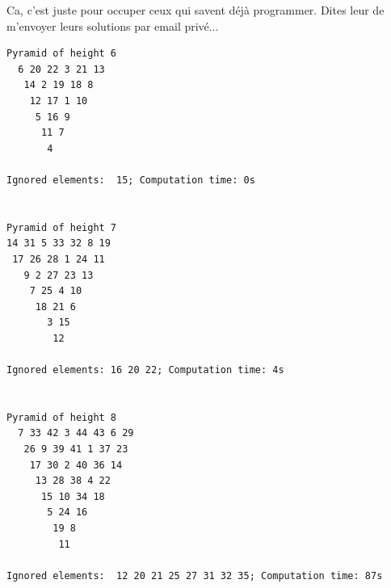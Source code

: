 \documentclass[10pt]{article}\usepackage[correction,nu]{esial}
\begin{document}
\begin{Reponse}
  Ca, c'est juste pour occuper ceux qui savent déjà programmer. Dites leur de
  m'envoyer leurs solutions par email privé...

  \begin{Verbatim}
Pyramid of height 6
  6 20 22 3 21 13
   14 2 19 18 8
    12 17 1 10
     5 16 9
      11 7
       4
  
Ignored elements:  15; Computation time: 0s
  

Pyramid of height 7
14 31 5 33 32 8 19
 17 26 28 1 24 11
   9 2 27 23 13
    7 25 4 10
     18 21 6
       3 15
        12

Ignored elements: 16 20 22; Computation time: 4s

  
Pyramid of height 8
  7 33 42 3 44 43 6 29
   26 9 39 41 1 37 23
    17 30 2 40 36 14
     13 28 38 4 22
      15 10 34 18
       5 24 16
        19 8
         11
  
Ignored elements:  12 20 21 25 27 31 32 35; Computation time: 87s
    
  \end{Verbatim}
\end{Reponse}
\end{document}
